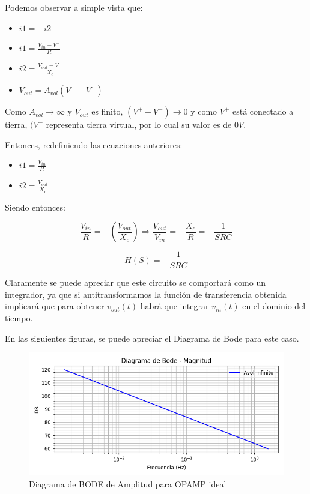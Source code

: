 Podemos observar a simple vista que:

\begin{itemize}
	\item $i1 = -i2$
	\item $i1 = \frac {V_{in}-V^{-}}{R} $
	\item $i2 = \frac {V_{out}-V^{-}}{X_c}$
	\item $V_{out} = A_{vol}(V^{+}-V^{-})$
\end{itemize}

Como ${A_{vol} \to \infty}$ y $V_{out}$ es finito, ${(V^{+}-V^{-}) \to 0}$ y como $V^{+}$ está conectado a tierra,
$(V^{-}$ representa tierra virtual, por lo cual su valor es de $0V$.

Entonces, redefiniendo las ecuaciones anteriores:

\begin{itemize}
	\item $i1 = \frac{V_{in}}{R} $
	\item $i2 = \frac {V_{out}}{X_c}$
\end{itemize}

Siendo entonces:

$$ \frac{V_{in}}{R} = - (\frac{V_{out}}{X_c}) \Longrightarrow \frac{V_{out}}{V_{in}} = -\frac{X_c}{R} = - \frac{1}{SRC}$$

$$ H(S) = - \frac{1}{SRC}$$

Claramente se puede apreciar que este circuito se comportará como un integrador, ya que si antitransformamos la función de transferencia
obtenida implicará que para obtener $v_{out}(t)$ habrá que integrar $v_{in}(t)$ en el dominio del tiempo.

En las siguientes figuras, se puede apreciar el Diagrama de Bode para este caso.

\begin{figure}[H]
    \centering 
    \includegraphics [scale=1] {../Ejercicio3-CircuitoIntegradoresyDerivadores/Imagenes/diagrama-bode-ideal-amplitud.png} 
    \caption{Diagrama de BODE de Amplitud para OPAMP ideal}
    \label{fig:emptyPlotTool}
\end{figure}


